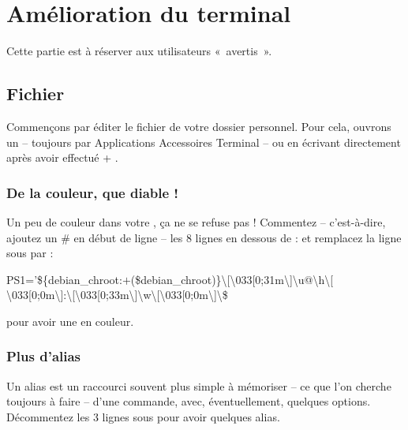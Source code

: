 \section{Amélioration du terminal}
\label{RefAmelioTerminal}
Cette partie est à réserver aux utilisateurs «~avertis~».\par
\subsection{Fichier }
Commençons par éditer le fichier  de votre dossier personnel. Pour cela, ouvrons un  -- toujours par Applications \FlecheDroite Accessoires \FlecheDroite Terminal -- ou en écrivant directement après avoir effectué  +  .\par
\subsubsection{De la couleur, que diable !}
Un peu de couleur dans votre , ça ne se refuse pas ! Commentez -- c'est-à-dire, ajoutez un \# en début de ligne -- les 8 lignes en dessous de :
et remplacez la ligne sous
par :
	\begin{breakbox}%
		\begin{otherlanguage}{english}%
			PS1='\$\{debian\_chroot:$+$(\$debian\_chroot)\}\textbackslash{}[\textbackslash{}033[0;31m\textbackslash{}]\textbackslash{}u@\textbackslash{}h\textbackslash{}[\\\textbackslash{}033[0;0m\textbackslash{}]:\textbackslash{}[\textbackslash{}033[0;33m\textbackslash{}]\textbackslash{}w\textbackslash{}[\textbackslash{}033[0;0m\textbackslash{}]\textbackslash{}\$%
		\end{otherlanguage}%
	\end{breakbox}%
pour avoir une  en couleur.
\subsubsection{Plus d'alias}
Un alias est un raccourci souvent plus simple à mémoriser -- ce que l'on cherche toujours à faire -- d'une commande, avec, éventuellement, quelques options. Décommentez les 3 lignes sous
pour avoir quelques alias.
